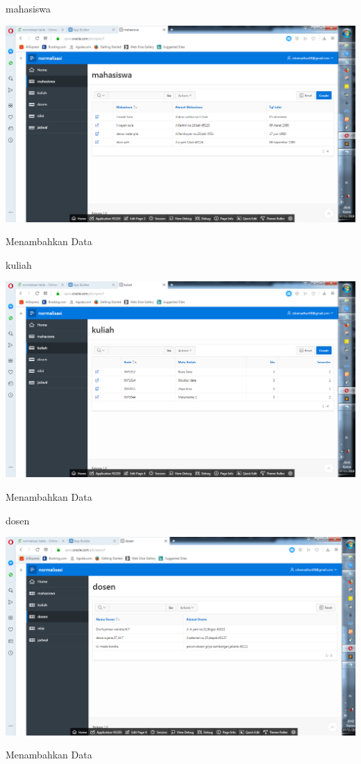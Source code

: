 \documentclass{article}
\begin{document}
\begin{enumerate}
    mahasiswa
        \begin{center}
         \centering
            \includegraphics[scale=0.27]{gambar/27.png}
        \caption{Menambahkan Data}
        \label{excel}
    \end{center}
    
    kuliah
        \begin{center}
         \centering
            \includegraphics[scale=0.27]{gambar/28.png}
        \caption{Menambahkan Data}
        \label{excel}
    \end{center}
    
    dosen
        \begin{center}
         \centering
            \includegraphics[scale=0.27]{gambar/29.png}
        \caption{Menambahkan Data}
        \label{excel}
    \end{center}
    

\end{enumerate}
\end{document}
